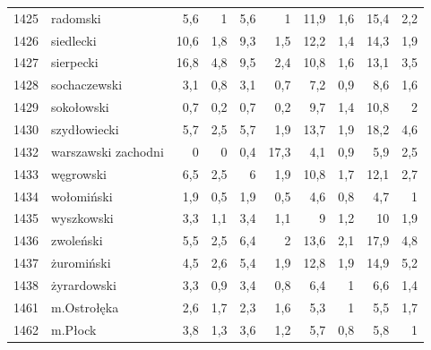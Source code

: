 \begin{center}
\begin{longtable}{lp{3cm}rrrrrrrr}
1425 & radomski                & 5,6     & 1           & 5,6      & 1            & 11,9     & 1,6          & 15,4     & 2,2          \\
1426 & siedlecki               & 10,6    & 1,8         & 9,3      & 1,5          & 12,2     & 1,4          & 14,3     & 1,9          \\
1427 & sierpecki               & 16,8    & 4,8         & 9,5      & 2,4          & 10,8     & 1,6          & 13,1     & 3,5          \\
1428 & sochaczewski            & 3,1     & 0,8         & 3,1      & 0,7          & 7,2      & 0,9          & 8,6      & 1,6          \\
1429 & sokołowski              & 0,7     & 0,2         & 0,7      & 0,2          & 9,7      & 1,4          & 10,8     & 2            \\
1430 & szydłowiecki            & 5,7     & 2,5         & 5,7      & 1,9          & 13,7     & 1,9          & 18,2     & 4,6          \\
1432 & warszawski zachodni     & 0       & 0           & 0,4      & 17,3         & 4,1      & 0,9          & 5,9      & 2,5          \\
1433 & węgrowski               & 6,5     & 2,5         & 6        & 1,9          & 10,8     & 1,7          & 12,1     & 2,7          \\
1434 & wołomiński              & 1,9     & 0,5         & 1,9      & 0,5          & 4,6      & 0,8          & 4,7      & 1            \\
1435 & wyszkowski              & 3,3     & 1,1         & 3,4      & 1,1          & 9        & 1,2          & 10       & 1,9          \\
1436 & zwoleński               & 5,5     & 2,5         & 6,4      & 2            & 13,6     & 2,1          & 17,9     & 4,8          \\
1437 & żuromiński              & 4,5     & 2,6         & 5,4      & 1,9          & 12,8     & 1,9          & 14,9     & 5,2          \\
1438 & żyrardowski             & 3,3     & 0,9         & 3,4      & 0,8          & 6,4      & 1            & 6,6      & 1,4          \\
1461 & m.Ostrołęka             & 2,6     & 1,7         & 2,3      & 1,6          & 5,3      & 1            & 5,5      & 1,7          \\
1462 & m.Płock                 & 3,8     & 1,3         & 3,6      & 1,2          & 5,7      & 0,8          & 5,8      & 1            \\

\end{longtable}
\end{center}

